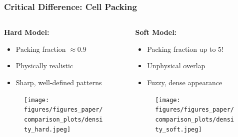 \documentclass[
	10pt,
	t
]{beamer}
\begin{document}
\begin{frame}
    \frametitle{Critical Difference: Cell Packing}

    \begin{columns}
        \begin{column}{0.5\textwidth}
            \textbf{Hard Model:}
            \begin{itemize}
                \item Packing fraction $\approx 0.9$
                \item Physically realistic
                \item Sharp, well-defined patterns
            \end{itemize}
            \centering
            \begin{figure}
                \texttt{[image: figures/figures\_paper/comparison\_plots/density\_hard.jpeg]}
            \end{figure}
        \end{column}
        \begin{column}{0.5\textwidth}
            \textbf{Soft Model:}
            \begin{itemize}
                \item Packing fraction up to 5!
                \item Unphysical overlap
                \item Fuzzy, dense appearance
            \end{itemize}
            \centering
            \begin{figure}
                \texttt{[image: figures/figures\_paper/comparison\_plots/density\_soft.jpeg]}
            \end{figure}
        \end{column}
    \end{columns}

\end{frame}
\end{document}
